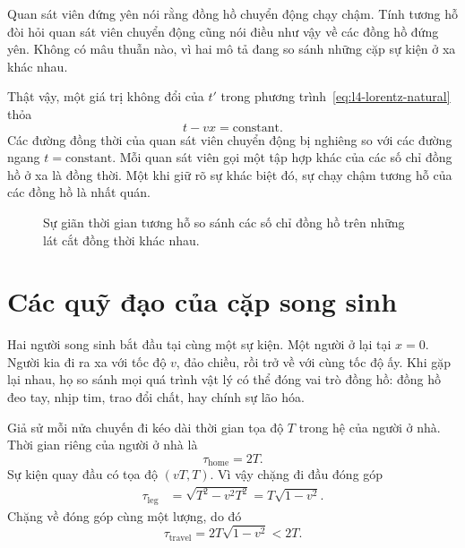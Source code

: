 Quan sát viên đứng yên nói rằng đồng hồ chuyển động chạy chậm. Tính tương hỗ đòi hỏi quan sát viên chuyển động cũng nói điều như vậy về các đồng hồ đứng yên. Không có mâu thuẫn nào, vì hai mô tả đang so sánh những cặp sự kiện ở xa khác nhau.

Thật vậy, một giá trị không đổi của $t'$ trong phương trình~\eqref{eq:l4-lorentz-natural} thỏa
\begin{equation}
t-vx=\text{constant}.
\label{eq:l4-simultaneity}
\end{equation}
Các đường đồng thời của quan sát viên chuyển động bị nghiêng so với các đường ngang $t=\text{constant}$. Mỗi quan sát viên gọi một tập hợp khác của các số chỉ đồng hồ ở xa là đồng thời. Một khi giữ rõ sự khác biệt đó, sự chạy chậm tương hỗ của các đồng hồ là nhất quán.

\begin{figure}[H]
\centering
{}
\caption{Sự giãn thời gian tương hỗ so sánh các số chỉ đồng hồ trên những lát cắt đồng thời khác nhau.}
\end{figure}

\section{Các quỹ đạo của cặp song sinh}

Hai người song sinh bắt đầu tại cùng một sự kiện. Một người ở lại tại $x=0$. Người kia đi ra xa với tốc độ $v$, đảo chiều, rồi trở về với cùng tốc độ ấy. Khi gặp lại nhau, họ so sánh mọi quá trình vật lý có thể đóng vai trò đồng hồ: đồng hồ đeo tay, nhịp tim, trao đổi chất, hay chính sự lão hóa.

Giả sử mỗi nửa chuyến đi kéo dài thời gian tọa độ $T$ trong hệ của người ở nhà. Thời gian riêng của người ở nhà là
\begin{equation}
\tau_{\mathrm{home}}=2T.
\end{equation}
Sự kiện quay đầu có tọa độ $(vT,T)$. Vì vậy chặng đi đầu đóng góp
\begin{align}
\tau_{\mathrm{leg}}
&=\sqrt{T^2-v^2T^2}
=T\sqrt{1-v^2}.
\end{align}
Chặng về đóng góp cùng một lượng, do đó
\begin{equation}
\tau_{\mathrm{travel}}=2T\sqrt{1-v^2}<2T.
\label{eq:l4-twin}
\end{equation}

